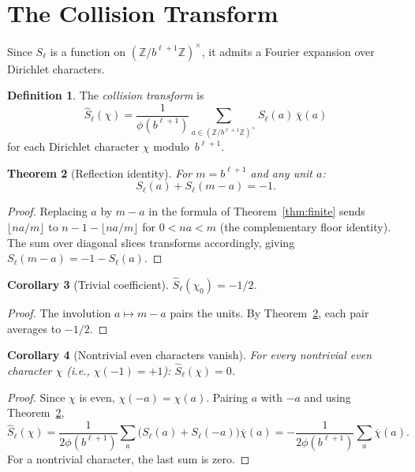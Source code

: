 \documentclass[12pt]{amsart}
\newtheorem{theorem}{Theorem}
\newtheorem{corollary}[theorem]{Corollary}
\theoremstyle{definition}
\newtheorem{definition}[theorem]{Definition}
\theoremstyle{remark}
\begin{document}
\section{The Collision Transform}

Since $S_{\ell}$ is a function on
$(\mathbb{Z}/b^{\ell+1}\mathbb{Z})^{\times}$, it admits a
Fourier expansion over Dirichlet characters.

\begin{definition}
The \emph{collision transform} is
\[
\hat{S}_{\ell}(\chi) = \frac{1}{\phi(b^{\ell+1})}
\sum_{a \in (\mathbb{Z}/b^{\ell+1}\mathbb{Z})^{\times}}
S_{\ell}(a)\, \overline{\chi}(a)
\]
for each Dirichlet character $\chi$ modulo~$b^{\ell+1}$.
\end{definition}

\begin{theorem}[Reflection identity]\label{thm:reflection}
For $m = b^{\ell+1}$ and any unit $a$:
\[
S_{\ell}(a) + S_{\ell}(m - a) = -1.
\]
\end{theorem}

\begin{proof}
Replacing $a$ by $m - a$ in the formula of
Theorem~\ref{thm:finite} sends
$\lfloor na/m \rfloor$ to $n - 1 - \lfloor na/m \rfloor$
for $0 < na < m$ (the complementary floor identity). The
sum over diagonal slices transforms accordingly, giving
$S_{\ell}(m - a) = -1 - S_{\ell}(a)$.
\end{proof}

\begin{corollary}[Trivial coefficient]\label{cor:trivial}
$\hat{S}_{\ell}(\chi_0) = -1/2$.
\end{corollary}

\begin{proof}
The involution $a \mapsto m - a$ pairs the units. By
Theorem~\ref{thm:reflection}, each pair averages to $-1/2$.
\end{proof}

\begin{corollary}[Nontrivial even characters vanish]
For every nontrivial even character $\chi$ (i.e., $\chi(-1) = +1$):
$\hat{S}_{\ell}(\chi) = 0$.
\end{corollary}

\begin{proof}
Since $\chi$ is even, $\chi(-a)=\chi(a)$. Pairing $a$ with
$-a$ and using Theorem~\ref{thm:reflection},
\[
\hat{S}_{\ell}(\chi)
= \frac{1}{2\phi(b^{\ell+1})}
\sum_{a}
\bigl(S_{\ell}(a)+S_{\ell}(-a)\bigr)\overline{\chi}(a)
= -\frac{1}{2\phi(b^{\ell+1})}\sum_a \overline{\chi}(a).
\]
For a nontrivial character, the last sum is zero.
\end{proof}
\end{document}
